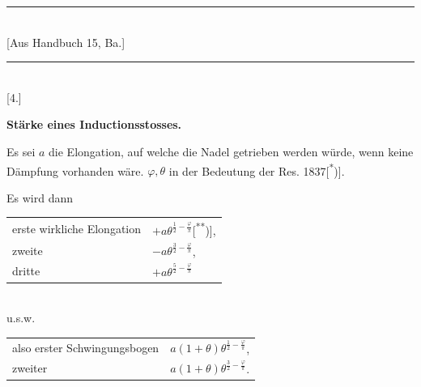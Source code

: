 \clearpage\begingroup{}
\begin{center}
\rule{.25\textwidth}{.35pt}\\
{\small [Aus Handbuch 15, Ba.]}\\
\rule{.25\textwidth}{.35pt}\\[.8em]
[4.]
\end{center}
\noindent{\small [S. 191]}
\begin{center}\textbf{Stärke eines Inductionsstosses.}\end{center}
\noindent\hspace*{\parindent}Es sei \(a\) die Elongation, auf welche die Nadel getrieben werden würde,
wenn keine Dämpfung vorhanden wäre. \(\varphi,\theta\) in der Bedeutung der Res. 1837[\textsuperscript{*})]\begingroup\renewcommand{\thefootnote}{}\endgroup.

Es wird dann
\begin{center}
\renewcommand{\arraystretch}{2.5}
\begin{tabular}{ll}
erste wirkliche Elongation&\( +a\theta^{\frac12-\frac{\varphi}{\pi}}\)[\textsuperscript{**})],\\
zweite&\( -a\theta^{\frac32-\frac{\varphi}{\pi}}\),\\
dritte&\( +a\theta^{\frac52-\frac{\varphi}{\pi}}\)
\end{tabular}\\
u.s.w.\par\medskip
\begin{tabular}{ll}
also erster Schwingungsbogen&\(a(1+\theta)\theta^{\frac12-\frac{\varphi}{\pi}}\),\\
zweiter&\(a(1+\theta)\theta^{\frac32-\frac{\varphi}{\pi}}\).
\end{tabular}
\end{center}
\begingroup\renewcommand{\thefootnote}{}\endgroup
\clearpage\endgroup
